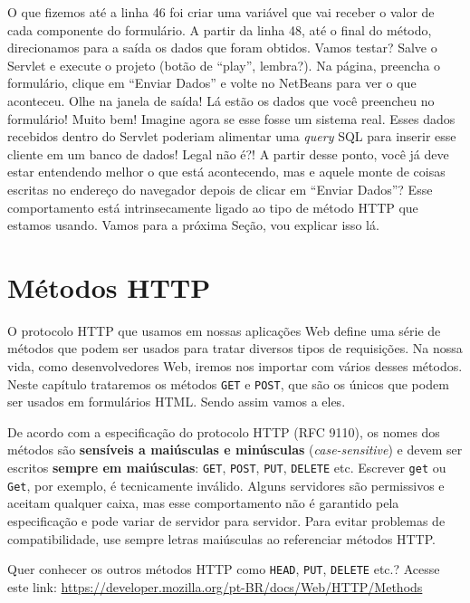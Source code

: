 O que fizemos até a linha 46 foi criar uma variável que vai receber o valor de cada componente do formulário. A partir da linha 48, até o final do método, direcionamos para a saída os dados que foram obtidos. Vamos testar? Salve o Servlet e execute o projeto (botão de ``play'', lembra?). Na página, preencha o formulário, clique em ``Enviar Dados'' e volte no NetBeans para ver o que aconteceu. Olhe na janela de saída! Lá estão os dados que você preencheu no formulário! Muito bem! Imagine agora se esse fosse um sistema real. Esses dados recebidos dentro do Servlet poderiam alimentar uma \textit{query} SQL para inserir esse cliente em um banco de dados! Legal não é?! A partir desse ponto, você já deve estar entendendo melhor o que está acontecendo, mas e aquele monte de coisas escritas no endereço do navegador depois de clicar em ``Enviar Dados''? Esse comportamento está intrinsecamente ligado ao tipo de método HTTP que estamos usando. Vamos para a próxima Seção, vou explicar isso lá.


\section{Métodos HTTP}

O protocolo HTTP que usamos em nossas aplicações Web define uma série de métodos que podem ser usados para tratar diversos tipos de requisições. Na nossa vida, como desenvolvedores Web, iremos nos importar com vários desses métodos. Neste capítulo trataremos os métodos \texttt{GET} e \texttt{POST}, que são os únicos que podem ser usados em formulários HTML. Sendo assim vamos a eles.

\begin{atencao}
    De acordo com a especificação do protocolo HTTP (RFC 9110), os nomes dos métodos são \textbf{sensíveis a maiúsculas e minúsculas} (\textit{case-sensitive}) e devem ser escritos \textbf{sempre em maiúsculas}: \texttt{GET}, \texttt{POST}, \texttt{PUT}, \texttt{DELETE} etc. Escrever \texttt{get} ou \texttt{Get}, por exemplo, é tecnicamente inválido. Alguns servidores são permissivos e aceitam qualquer caixa, mas esse comportamento não é garantido pela especificação e pode variar de servidor para servidor. Para evitar problemas de compatibilidade, use sempre letras maiúsculas ao referenciar métodos HTTP.
\end{atencao}

\begin{saibaMais}
    Quer conhecer os outros métodos HTTP como \texttt{HEAD}, \texttt{PUT}, \texttt{DELETE} etc.? Acesse este link: \url{https://developer.mozilla.org/pt-BR/docs/Web/HTTP/Methods}
\end{saibaMais}


